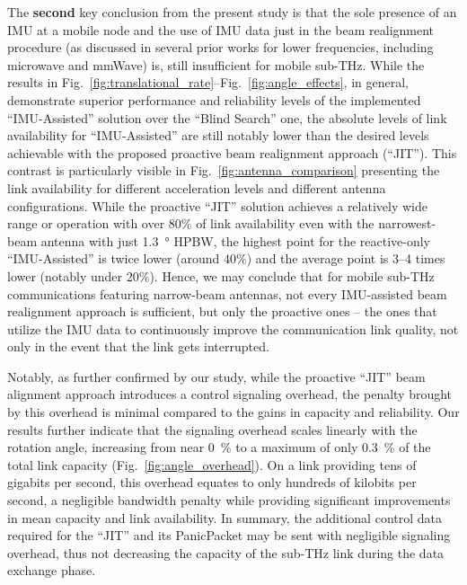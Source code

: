 \documentclass[fleqn,10pt]{wlscirep}
\begin{document}
The \textbf{second} key conclusion from the present study is that the sole presence of an IMU at a mobile node and the use of IMU data just in the beam realignment procedure (as discussed in several prior works for lower frequencies, including microwave and mmWave) is, still insufficient for mobile sub-THz. While the results in Fig.~\ref{fig:translational_rate}--Fig.~\ref{fig:angle_effects}, in general, demonstrate superior performance and reliability levels of the implemented ``IMU-Assisted'' solution over the ``Blind Search'' one, the absolute levels of link availability for ``IMU-Assisted'' are still notably lower than the desired levels achievable with the proposed proactive beam realignment approach (``JIT''). This contrast is particularly visible in Fig.~\ref{fig:antenna_comparison} presenting the link availability for different acceleration levels and different antenna configurations. While the proactive ``JIT'' solution achieves a relatively wide range or operation with over $80\%$ of link availability even with the narrowest-beam antenna with just \SI{1.3}{\degree} HPBW, the highest point for the reactive-only ``IMU-Assisted'' is twice lower (around $40\%$) and the average point is 3--4 times lower (notably under $20\%$). Hence, we may conclude that for mobile sub-THz communications featuring narrow-beam antennas, not every IMU-assisted beam realignment approach is sufficient, but only the proactive ones -- the ones that utilize the IMU data to continuously improve the communication link quality, not only in the event that the link gets interrupted.

Notably, as further confirmed by our study, while the proactive ``JIT'' beam alignment approach introduces a control signaling overhead, the penalty brought by this overhead is minimal compared to the gains in capacity and reliability. Our results further indicate that the signaling overhead scales linearly with the rotation angle, increasing from near \SI{0}{\percent} to a maximum of only \SI{0.3}{\percent} of the total link capacity (Fig.~\ref{fig:angle_overhead}). On a link providing tens of gigabits per second, this overhead equates to only hundreds of kilobits per second, a negligible bandwidth penalty while providing significant improvements in mean capacity and link availability. In summary, the additional control data required for the ``JIT'' and its PanicPacket may be sent with negligible signaling overhead, thus not decreasing the capacity of the sub-THz link during the data exchange phase.
\end{document}
